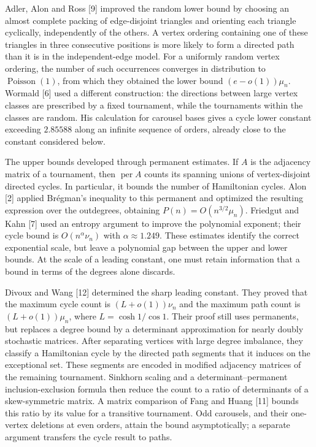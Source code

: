 \documentclass[11pt,a4paper]{article}
\begin{document}
Adler, Alon and Ross {[}9{]} improved the random lower bound by choosing an almost complete packing of edge-disjoint triangles and orienting each triangle cyclically, independently of the others. A vertex ordering containing one of these triangles in three consecutive positions is more likely to form a directed path than it is in the independent-edge model. For a uniformly random vertex ordering, the number of such occurrences converges in distribution to \(\operatorname{Poisson}(1)\), from which they obtained the lower bound \((e-o(1))\mu_n\). Wormald {[}6{]} used a different construction: the directions between large vertex classes are prescribed by a fixed tournament, while the tournaments within the classes are random. His calculation for carousel bases gives a cycle lower constant exceeding \(2.85588\) along an infinite sequence of orders, already close to the constant considered below.

The upper bounds developed through permanent estimates. If \(A\) is the adjacency matrix of a tournament, then \(\operatorname{per}A\) counts its spanning unions of vertex-disjoint directed cycles. In particular, it bounds the number of Hamiltonian cycles. Alon {[}2{]} applied Brégman's inequality to this permanent and optimized the resulting expression over the outdegrees, obtaining \(P(n)=O(n^{3/2}\mu_n)\). Friedgut and Kahn {[}7{]} used an entropy argument to improve the polynomial exponent; their cycle bound is \(O(n^{\alpha}\nu_n)\) with \(\alpha\approx1.249\). These estimates identify the correct exponential scale, but leave a polynomial gap between the upper and lower bounds. At the scale of a leading constant, one must retain information that a bound in terms of the degrees alone discards.

Divoux and Wang {[}12{]} determined the sharp leading constant. They proved that the maximum cycle count is \((L+o(1))\nu_n\) and the maximum path count is \((L+o(1))\mu_n\), where \(L=\cosh1/\cos1\). Their proof still uses permanents, but replaces a degree bound by a determinant approximation for nearly doubly stochastic matrices. After separating vertices with large degree imbalance, they classify a Hamiltonian cycle by the directed path segments that it induces on the exceptional set. These segments are encoded in modified adjacency matrices of the remaining tournament. Sinkhorn scaling and a determinant--permanent inclusion-exclusion formula then reduce the count to a ratio of determinants of a skew-symmetric matrix. A matrix comparison of Fang and Huang {[}11{]} bounds this ratio by its value for a transitive tournament. Odd carousels, and their one-vertex deletions at even orders, attain the bound asymptotically; a separate argument transfers the cycle result to paths.
\end{document}
